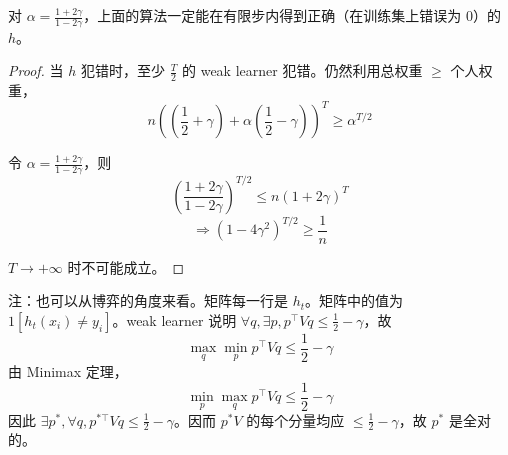 \begin{theorem}
    对 $\alpha = \frac{1+2\gamma}{1-2\gamma}$，上面的算法一定能在有限步内得到正确（在训练集上错误为 $0$）的 $h$。
\end{theorem}

\begin{proof}
    当 $h$ 犯错时，至少 $\frac{T}{2}$ 的 weak learner 犯错。仍然利用总权重 $\ge$ 个人权重，
    \[
        n\left(\left(\frac{1}{2}+\gamma\right) + \alpha\left(\frac{1}{2}-\gamma\right)\right)^T \ge \alpha^{T/2}
    \]
    
    令 $\alpha = \frac{1+2\gamma}{1-2\gamma}$，则
    \[
        \left(\frac{1+2\gamma}{1-2\gamma}\right)^{T/2} \le n(1+2\gamma)^T
    \]
    \[
        \Rightarrow (1-4\gamma^2)^{T/2} \ge \frac{1}{n}
    \]
    
    $T \to +\infty$ 时不可能成立。
\end{proof}

注：也可以从博弈的角度来看。矩阵每一行是 $h_t$。矩阵中的值为 $1[h_t(x_i) \ne y_i]$。weak learner 说明 $\forall q, \exists p, p^\top V q \le \frac{1}{2} - \gamma$，故
\[
    \max_q \min_p p^\top V q \le \frac{1}{2} - \gamma
\]
由 Minimax 定理，
\[
    \min_p \max_q p^\top V q \le \frac{1}{2} - \gamma
\]
因此 $\exists p^*, \forall q, p^{*\top} V q \le \frac{1}{2} - \gamma$。因而 $p^*V$ 的每个分量均应 $\le \frac{1}{2} - \gamma$，故 $p^*$ 是全对的。
